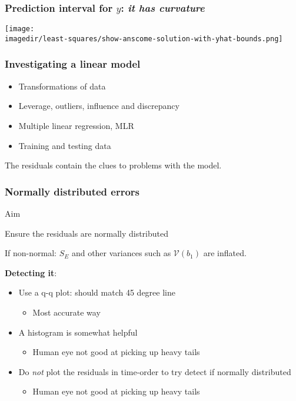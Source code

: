 \begin{frame}\frametitle{Prediction interval for $y$: \emph{it has curvature}}
	\begin{center}
		\texttt{[image: \\imagedir/least-squares/show-anscome-solution-with-yhat-bounds.png]}
	\end{center}
\end{frame}

\begin{frame}\frametitle{Investigating a linear model}
	\begin{itemize}
		\item	Transformations of data
		\item	Leverage, outliers, influence and discrepancy
		\item	Multiple linear regression, MLR
		\item	Training and testing data
	\end{itemize}

	\vspace{12pt}
	The residuals contain the clues to problems with the model.
\end{frame}

\begin{frame}\frametitle{Normally distributed errors}

	\begin{exampleblock}{Aim}
		\begin{center}
			Ensure the residuals are normally distributed
		\end{center}
	\end{exampleblock}

	If non-normal: $S_E$ and other variances such as $\mathcal{V}(b_1)$ are inflated.

	\vspace{12pt}
	\textbf{Detecting it}:
	\begin{itemize}
		\item	Use a q-q plot: should match 45 degree line
		\begin{itemize}
			\item	Most accurate way
		\end{itemize}
		\item	A histogram is somewhat helpful
		\begin{itemize}
			\item	Human eye not good at picking up heavy tails
		\end{itemize}
		\item	Do \emph{not} plot the residuals in time-order to try detect if normally distributed
		\begin{itemize}
			\item	Human eye not good at picking up heavy tails
		\end{itemize}
	\end{itemize}
\end{frame}

